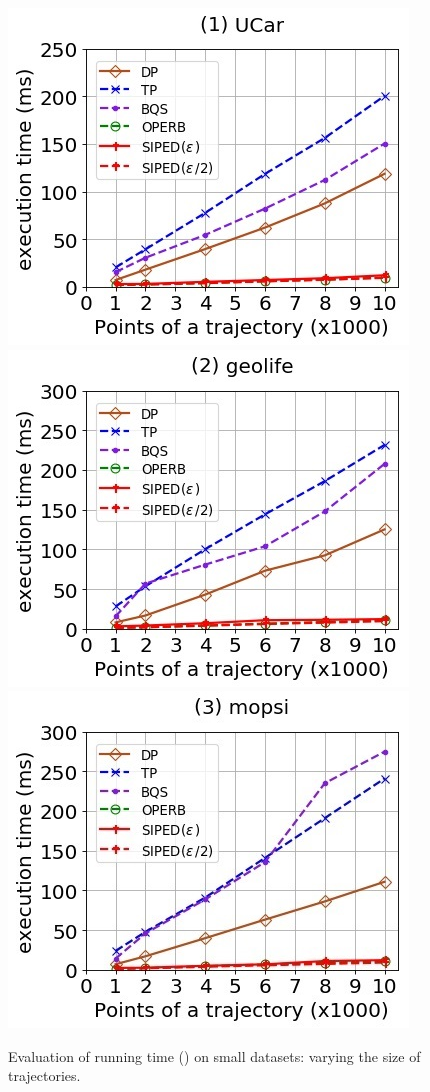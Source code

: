 \begin{figure}[tb!]
	\centering
	\includegraphics[scale=0.500]{Figures/Exp-PED-time-size-service.jpg}	\hspace{2ex}
	\includegraphics[scale=0.500]{Figures/Exp-PED-time-size-geolife.jpg}	\hspace{2ex}
	\includegraphics[scale=0.500]{Figures/Exp-PED-time-size-mopsi.jpg}	
	\vspace{-2ex}
	\caption{\small Evaluation of running time (\ped) on small datasets: varying the size of trajectories.}\label{fig:time-size-ped}
	\vspace{-2ex}
\end{figure}

